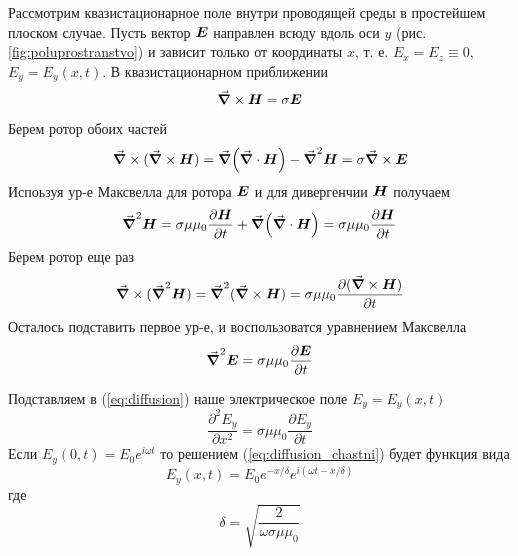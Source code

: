 \documentclass[a4paper]{article}
\begin{document}
Рассмотрим квазистационарное поле внутри проводящей среды в простейшем плоском случае.
Пусть вектор $\vb*{E}$ направлен всюду вдоль оси $y$ (рис.\ref{fig:poluprostranstvo})
и зависит только от координаты $x$, т. е. ${E_x} = {E_z} \equiv 0$, $E_y=E_y(x,t)$.
В квазистационарном приближении
\begin{equation*}
    \grad \times \vb*{H} = \sigma \vb*{E}
\end{equation*}
Берем ротор обоих частей
\begin{equation*}
    \grad \times (\grad \times \vb*{H}) = \grad(\grad \cdot \vb*{H}) - \grad^2\vb*{H} = \sigma \grad \times \vb*{E}
\end{equation*}
Испоьзуя ур-е Максвелла для ротора $\vb*{E}$ и для дивергенчии $\vb*{H}$ получаем
\begin{equation}
    \grad^2 \vb*{H} = \sigma\mu\mu_0\frac{\partial\vb*{H}}{\partial t}
    + \grad(\grad \cdot \vb*{H}) = \sigma\mu\mu_0\frac{\partial\vb*{H}}{\partial t}
    \label{eq:laplacian_H}
\end{equation}
Берем ротор еще раз
\begin{equation*}
    \grad \times (\grad^2\vb*{H}) = \grad^2 (\grad \times \vb*{H}) =
    \sigma\mu\mu_0 \frac{\partial (\grad \times \vb*{H})}{\partial t}
\end{equation*}
Осталось подставить первое ур-е, и воспользоватся уравнением Максвелла
\begin{equation}
    \grad^2\vb*{E}=\sigma\mu\mu_0 \frac{\partial \vb*{E}}{\partial t}\label{eq:diffusion}
\end{equation}

Подставляем в (\ref{eq:diffusion}) наше электрическое поле $E_y=E_y(x,t)$
\begin{equation}
    \frac{\partial^2 E_y}{\partial x^2} = \sigma\mu\mu_0\frac{\partial E_y}{\partial t}
    \label{eq:diffusion_chastni}
\end{equation}
Если $E_y(0,t)=E_0 e^{i\omega t}$ то решением (\ref{eq:diffusion_chastni}) будет функция вида
\begin{equation}
    E_y(x,t)=E_0 e^{-x/\delta} e^{i(\omega t - x/\delta)}
    \label{eq:skin_effect_poluprostranstvo}
\end{equation}
где
\begin{equation}
    \delta = \sqrt{\frac{2}{\omega\sigma\mu\mu_0}}
    \label{eq:delta}
\end{equation}

\newpage
\end{document}
